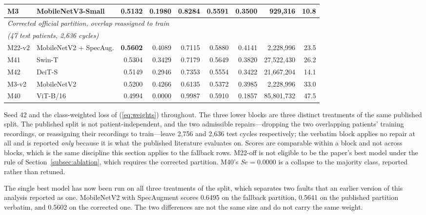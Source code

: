 \documentclass[journal,onecolumn]{IEEEtran}
\newcommand{\best}[1]{\textbf{#1}}
\begin{document}
\begin{table}[!t]
\begin{tabular}{llrrrrrrr}
M3     & MobileNetV3-Small       & \best{0.5132} & 0.1980 & 0.8284 & 0.5591 & 0.3500 & 929{,}316     & 10.8 \\
\midrule
\multicolumn{9}{l}{\emph{Corrected official partition, overlap reassigned to train}}\\
\multicolumn{9}{l}{\emph{(47 test patients, 2{,}636 cycles)}}\\
M22-v2 & MobileNetV2 + SpecAug.  & \best{0.5602} & 0.4089 & 0.7115 & 0.5880 & 0.4141 & 2{,}228{,}996 & 23.5 \\
M41    & Swin-T                  & 0.5304 & 0.3429 & 0.7179 & 0.5649 & 0.3820 & 27{,}522{,}430 & 26.2 \\
M42    & DeiT-S                  & 0.5149 & 0.2946 & 0.7353 & 0.5554 & 0.3422 & 21{,}667{,}204 & 14.1 \\
M3-v2  & MobileNetV2             & 0.5200 & 0.4266 & 0.6135 & 0.5372 & 0.3985 & 2{,}228{,}996 & 33.0 \\
M40    & ViT-B/16                & 0.4994 & 0.0000 & 0.9987 & 0.5910 & 0.1857 & 85{,}801{,}732 & 47.5 \\
\bottomrule
\end{tabular}

\vspace{2pt}
\footnotesize Seed 42 and the class-weighted loss of (\ref{eq:weights}) throughout.
The three lower blocks are three distinct treatments of the same published split. The
published split is not patient-independent, and the two admissible repairs---dropping the
two overlapping patients' training recordings, or reassigning their recordings to
train---leave 2{,}756 and 2{,}636 test cycles respectively; the verbatim block applies no
repair at all and is reported \emph{only} because it is what the published literature
evaluates on. Scores are comparable within a block and not across blocks, which is the
same discipline this section applies to the fallback rows. M22-off is not eligible to be
the paper's best model under the rule of Section~\ref{subsec:ablation}, which requires the
corrected partition. M40's $Se = 0.0000$ is a collapse to the majority class, reported
rather than retuned.
\end{table}

The single best model has now been run on all three treatments of the split, which
separates two faults that an earlier version of this analysis reported as one.
MobileNetV2 with SpecAugment scores 0.6495 on the fallback partition, 0.5641 on the
published partition verbatim, and 0.5602 on the corrected one. The two differences are
not the same size and do not carry the same weight.
\end{document}
